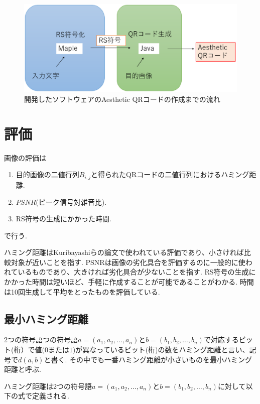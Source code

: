 \documentclass{thesis}
\begin{document}
\begin{figure}[H]
      \centering
      \includegraphics[width=1\linewidth]{pic/Maple_Java.eps}
      \caption{開発したソフトウェアのAesthetic QRコードの作成までの流れ}
      \label{soft}
\end{figure}

\section{評価}

画像の評価は
\begin{enumerate}
\item
目的画像の二値行列$B_{i,j}$と得られたQRコードの二値行列におけるハミング距離.
\item
$PSNR$(ピーク信号対雑音比).
\item
RS符号の生成にかかった時間.

\end{enumerate}
で行う.

ハミング距離はKuribayashiらの論文\cite{KURI}で使われている評価であり、小さければ比較対象が近いことを指す.
PSNRは画像の劣化具合を評価するのに一般的に使われているものであり、大きければ劣化具合が少ないことを指す.
RS符号の生成にかかった時間は短いほど、手軽に作成することが可能であることがわかる.
時間は10回生成して平均をとったものを評価している.

\subsection{最小ハミング距離}

2つの符号語つの符号語$a=(a_1,a_2,…,a_n)$と$b=(b_1,b_2,…,b_n)$で対応するビット(桁）で値$(0$または$1)$が異なっているビット(桁)の数をハミング距離と言い、記号で$d(a,b)$と書く.
その中でも一番ハミング距離が小さいものを最小ハミング距離と呼ぶ.

ハミング距離は2つの符号語$a=(a_1,a_2,…,a_n)$と$b=(b_1,b_2,…,b_n)$に対して以下の式で定義される.
\end{document}
